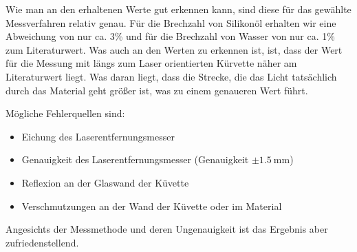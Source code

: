  Wie man an den erhaltenen Werte gut erkennen kann, sind diese für das gewählte Messverfahren relativ genau. Für die Brechzahl von Silikonöl erhalten wir eine Abweichung von nur ca. 3\% und für die Brechzahl von Wasser von nur ca. 1\% zum Literaturwert. Was auch an den Werten zu erkennen ist, ist, dass der Wert für die Messung mit längs zum Laser orientierten Kürvette näher am Literaturwert liegt. Was daran liegt, dass die Strecke, die das Licht tatsächlich durch das Material geht größer ist, was zu einem genaueren Wert führt.
 
 Mögliche Fehlerquellen sind: 
 
 \begin{itemize}
     \item Eichung des Laserentfernungsmesser
     \item Genauigkeit des Laserentfernungsmesser (Genauigkeit $\pm \SI{1.5}{\milli\metre}$)
     \item Reflexion an der Glaswand der Küvette
     \item Verschmutzungen an der Wand der Küvette oder im Material
 \end{itemize}
 
 Angesichts der Messmethode und deren Ungenauigkeit ist das Ergebnis aber zufriedenstellend.